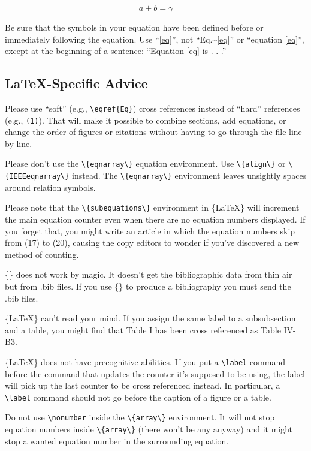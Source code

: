 \documentclass[conference]{IEEEtran}
\begin{document}
 \begin{equation}
a+b=\gamma\label{eq}
 \end{equation}

Be sure that the symbols in your equation have been defined before or immediately following the equation. Use ``\eqref{eq}'', not ``Eq.\textasciitilde{}\eqref{eq}'' or ``equation \eqref{eq}'', except at the beginning of a sentence: ``Equation \eqref{eq} is . . .''

\subsection{\LaTeX{}-Specific Advice}
\label{sec:org8768d15}
Please use ``soft'' (e.g., \verb|\eqref{Eq}|) cross references instead of ``hard'' references (e.g., \verb|(1)|). That will make it possible to combine sections, add equations, or change the order of figures or citations without having to go through the file line by line.

Please don't use the \verb|\{eqnarray\}| equation environment. Use \verb|\{align\}| or \verb|\{IEEEeqnarray\}| instead. The \verb|\{eqnarray\}| environment leaves unsightly spaces around relation symbols.

Please note that the \verb|\{subequations\}| environment in \{\LaTeX\} will increment the main equation counter even when there are no equation numbers displayed. If you forget that, you might write an article in which the equation numbers skip from (17) to (20), causing the copy editors to wonder if you've discovered a new method of counting.

\{\BibTeX\} does not work by magic. It doesn't get the bibliographic data from thin air but from .bib files. If you use \{\BibTeX\} to produce a bibliography you must send the .bib files.

\{\LaTeX\} can't read your mind. If you assign the same label to a subsubsection and a table, you might find that Table I has been cross referenced as Table IV-B3.

\{\LaTeX\} does not have precognitive abilities. If you put a \verb|\label| command before the command that updates the counter it's supposed to be using, the label will pick up the last counter to be cross referenced instead. In particular, a \verb|\label| command should not go before the caption of a figure or a table.

Do not use \verb|\nonumber| inside the \verb|\{array\}| environment. It will not stop equation numbers inside \verb|\{array\}| (there won't be any anyway) and it might stop a wanted equation number in the surrounding equation.
\end{document}

